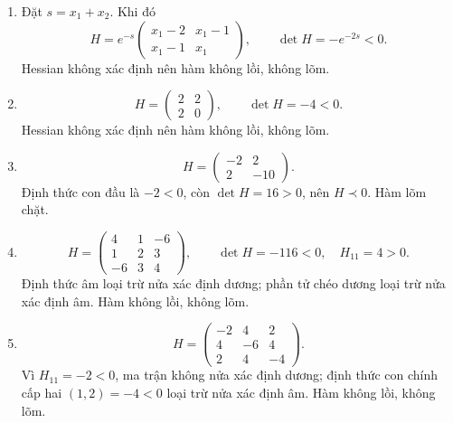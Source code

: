 \documentclass[11pt,a4paper]{article}
\begin{document}
\begin{enumerate}[label=\roman*),leftmargin=*,itemsep=.45em]
\item Đặt \(s=x_1+x_2\). Khi đó
\[
H=e^{-s}\begin{pmatrix}x_1-2&x_1-1\\x_1-1&x_1\end{pmatrix},\qquad \det H=-e^{-2s}<0.
\]
Hessian không xác định nên hàm không lồi, không lõm.
\item \[
H=\begin{pmatrix}2&2\\2&0\end{pmatrix},\qquad \det H=-4<0.
\]
Hessian không xác định nên hàm không lồi, không lõm.
\item \[
H=\begin{pmatrix}-2&2\\2&-10\end{pmatrix}.
\]
Định thức con đầu là \(-2<0\), còn \(\det H=16>0\), nên \(H\prec0\). Hàm lõm chặt.
\item \[
H=\begin{pmatrix}4&1&-6\\1&2&3\\-6&3&4\end{pmatrix},\qquad \det H=-116<0,\quad H_{11}=4>0.
\]
Định thức âm loại trừ nửa xác định dương; phần tử chéo dương loại trừ nửa xác định âm. Hàm không lồi, không lõm.
\item \[
H=\begin{pmatrix}-2&4&2\\4&-6&4\\2&4&-4\end{pmatrix}.
\]
Vì \(H_{11}=-2<0\), ma trận không nửa xác định dương; định thức con chính cấp hai \((1,2)=-4<0\) loại trừ nửa xác định âm. Hàm không lồi, không lõm.
\end{enumerate}

\clearpage
\end{document}
